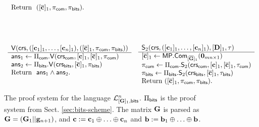 \begin{figure}
\begin{\algSize}
$$\begin{array}{ll}
\begin{array}{l}
\text{Return } \  ([\overline{\mathbf{c}}]_1,\pi_{\mathsf{com}},\pi_{\mathsf{bits}}). \\
\\
\\
\\
\\
\end{array}\\
\begin{array}{l}
{\mathsf{V}(\mathsf{crs},([\mathbf{c}_1]_1,\ldots,[\mathbf{c}_n]_1),([\overline{\mathbf{c}}]_1,\pi_{\mathsf{com}},\pi_{\mathsf{bits}}))}\\
\hline
\mathsf{ans}_1 \gets \Pi_{\mathsf{com}}.\mathsf{V}(\mathsf{crs}_{\mathsf{com}},[\mathbf{c}]_1,[\overline{\mathbf{c}}]_1,\pi_{\mathsf{com}})\\
\mathsf{ans}_2 \gets \Pi_{\mathsf{bits}}.\mathsf{V}(\mathsf{crs}_{\mathsf{bits}},[\overline{\mathbf{c}}]_1,\pi_{\mathsf{bits}})\\
\text{Return } \ \mathsf{ans}_1\wedge\mathsf{ans}_2.
\\
\\
\end{array}
&
\begin{array}{l}
{\mathsf{S}_2(\mathsf{crs},([\mathbf{c}_1]_1,\ldots,[\mathbf{c}_n]_1),[\mathbf{{D}}]_1,\tau)}\\
\hline
{[\overline{\mathbf{c}}]_1 \gets \mathsf{MP}.\mathsf{Com}_{[\overline{\mathbf{{G}}}]_1}(\mathbf{0}_{mn\times 1})}\\
\pi_{\mathsf{com}}\gets \Pi_{\mathsf{com}}.\mathsf{S}_2(\mathsf{crs}_{\mathsf{com}},[\mathbf{c}]_1,[\overline{\mathbf{c}}]_1,\tau_{\mathsf{com}})\\
\pi_{\mathsf{bits}} \gets \Pi_{\mathsf{bits}}.\mathsf{S}_2(\mathsf{crs}_{\mathsf{bits}},[\overline{\mathbf{c}}]_1,\tau_{\mathsf{bits}})\\
\text{Return }  ([\overline{\mathbf{c}}]_1,\pi_{\mathsf{com}}, \pi_{\mathsf{bits}}).
\end{array}
\end{array}$$
\end{\algSize}
\caption{The proof system for the language $\mathcal{L}_{[\mathbf{{G}}]_1,\mathsf{bits}}^n$. $\Pi_{\mathsf{bits}}$ is the proof system from Sect. \ref{sec:bits-scheme}. The matrix $\mathbf{{G}}$ is parsed as $\mathbf{G}=(\mathbf{G}_1||\mathbf{g}_{n+1})$, and $\mathbf{c}:=\mathbf{c}_1\oplus\ldots\oplus\mathbf{c}_n$ and $\mathbf{b}:=\mathbf{b}_1\oplus\ldots\oplus\mathbf{b}$.
\label{fig:bitsn}
}
\end{figure}
